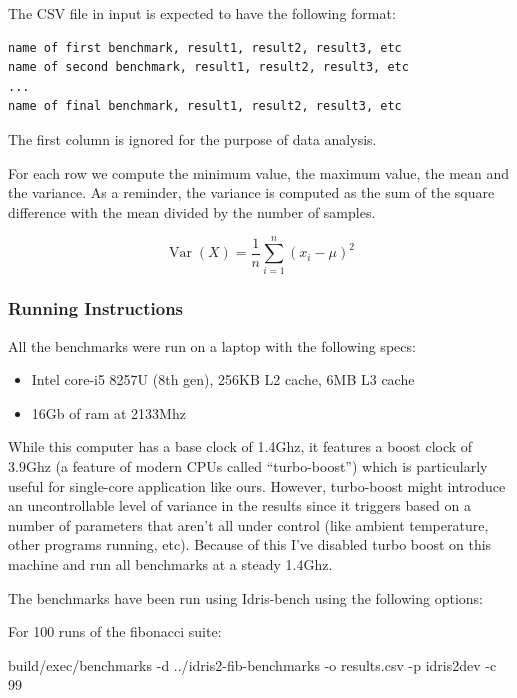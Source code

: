 \documentclass[
]{article}
\newenvironment{Shaded}{}{}
\newcommand{\DecValTok}[1]{\textcolor[rgb]{0.25,0.63,0.44}{#1}}
\newcommand{\NormalTok}[1]{#1}
\newcommand{\OperatorTok}[1]{\textcolor[rgb]{0.40,0.40,0.40}{#1}}
\providecommand{\tightlist}{%
  \setlength{\itemsep}{0pt}\setlength{\parskip}{0pt}}
\begin{document}
The CSV file in input is expected to have the following format:

\begin{verbatim}
name of first benchmark, result1, result2, result3, etc
name of second benchmark, result1, result2, result3, etc
...
name of final benchmark, result1, result2, result3, etc
\end{verbatim}

The first column is ignored for the purpose of data analysis.

For each row we compute the minimum value, the maximum value, the mean
and the variance. As a reminder, the variance is computed as the sum of
the square difference with the mean divided by the number of samples.

\[ \operatorname{Var}(X) = \frac{1}{n} \sum_{i=1}^n (x_i - \mu)^2 \]

\hypertarget{running-instructions}{%
\subsubsection{Running Instructions}\label{running-instructions}}

All the benchmarks were run on a laptop with the following specs:

\begin{itemize}
\tightlist
\item
  Intel core-i5 8257U (8th gen), 256KB L2 cache, 6MB L3 cache
\item
  16Gb of ram at 2133Mhz
\end{itemize}

While this computer has a base clock of 1.4Ghz, it features a boost
clock of 3.9Ghz (a feature of modern CPUs called ``turbo-boost'') which
is particularly useful for single-core application like ours. However,
turbo-boost might introduce an uncontrollable level of variance in the
results since it triggers based on a number of parameters that aren't
all under control (like ambient temperature, other programs running,
etc). Because of this I've disabled turbo boost on this machine and run
all benchmarks at a steady 1.4Ghz.

The benchmarks have been run using Idris-bench using the following
options:

For 100 runs of the fibonacci suite:

\begin{Shaded}
\begin{Highlighting}[]
\NormalTok{build}\OperatorTok{/}\NormalTok{exec}\OperatorTok{/}\NormalTok{benchmarks }\OperatorTok{{-}}\NormalTok{d }\OperatorTok{../}\NormalTok{idris2}\OperatorTok{{-}}\NormalTok{fib}\OperatorTok{{-}}\NormalTok{benchmarks }
                      \OperatorTok{{-}}\NormalTok{o results}\OperatorTok{.}\NormalTok{csv }
                      \OperatorTok{{-}}\NormalTok{p idris2dev }
                      \OperatorTok{{-}}\NormalTok{c }\DecValTok{99}
\end{Highlighting}
\end{Shaded}
\end{document}
